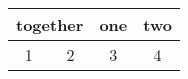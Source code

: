 \documentclass[a4paper,12pt]{article}
\begin{document}
	\begin{table}
	\centering
	\begin{tabular}{c|c|c|c}
		\hline
		\multicolumn{2}{c|}{together} & one & two \\
		\hline
		1 & 2 & 3 & 4 \\
		\hline
	\end{tabular}
\end{table}
\end{document}

